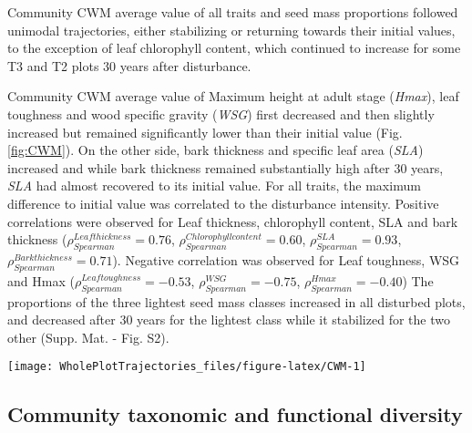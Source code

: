 \documentclass[fleqn,10pt]{ArtEcoFoG} %
\begin{document}
Community CWM average value of all traits and seed mass proportions
followed unimodal trajectories, either stabilizing or returning towards
their initial values, to the exception of leaf chlorophyll content,
which continued to increase for some T3 and T2 plots 30 years after
disturbance.

Community CWM average value of Maximum height at adult stage
(\emph{Hmax}), leaf toughness and wood specific gravity (\emph{WSG})
first decreased and then slightly increased but remained significantly
lower than their initial value (Fig. \ref{fig:CWM}). On the other side,
bark thickness and specific leaf area (\emph{SLA}) increased and while
bark thickness remained substantially high after 30 years, \emph{SLA}
had almost recovered to its initial value. For all traits, the maximum
difference to initial value was correlated to the disturbance intensity.
Positive correlations were observed for Leaf thickness, chlorophyll
content, SLA and bark thickness
(\(\rho_{Spearman}^{Leaf thickness}=0.76\),
\(\rho_{Spearman}^{Chlorophyll content}=0.60\),
\(\rho_{Spearman}^{SLA}=0.93\),
\(\rho_{Spearman}^{Bark thickness}=0.71\)). Negative correlation was
observed for Leaf toughness, WSG and Hmax
(\(\rho_{Spearman}^{Leaf toughness}=-0.53\),
\(\rho_{Spearman}^{WSG}=-0.75\), \(\rho_{Spearman}^{Hmax}=-0.40\)) The
proportions of the three lightest seed mass classes increased in all
disturbed plots, and decreased after 30 years for the lightest class
while it stabilized for the two other (Supp. Mat. - Fig. S2).

\begin{figure*}

{\centering \texttt{[image: WholePlotTrajectories\_files/figure-latex/CWM-1]} 

}

\caption{Trajectories of community weighted means over 30 years after disturbance of four leaf traits (Leaf thickness, chlorophyll content, toughness, and specific area), two stem traits (wood specific gravity, and bark thickness) and one life history trait (Specific maximum height at adult stage). }\label{fig:CWM}
\end{figure*}

\subsection{Community taxonomic and functional
diversity}\label{community-taxonomic-and-functional-diversity}
\end{document}
